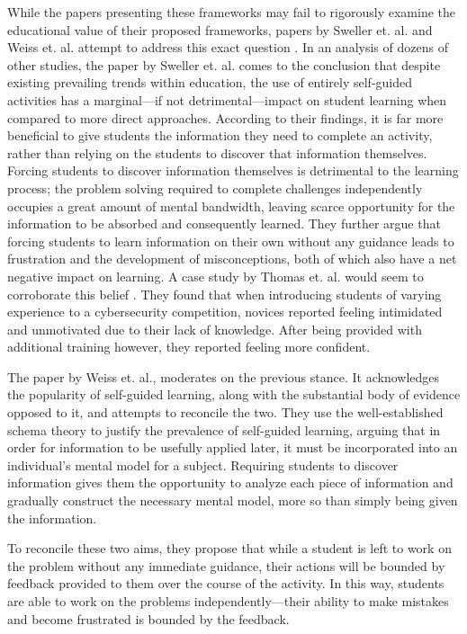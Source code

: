 \documentclass{article}
\begin{document}
    While the papers presenting these frameworks may fail to rigorously examine the educational value of their proposed frameworks, papers by Sweller et. al. and Weiss et. al. attempt to address this exact question \cite{J-Sweller,R-Weiss}. In an analysis of dozens of other studies, the paper by Sweller et. al. comes to the conclusion that despite existing prevailing trends within education, the use of entirely self-guided activities has a marginal---if not detrimental---impact on student learning when compared to more direct approaches. According to their findings, it is far more beneficial to give students the information they need to complete an activity, rather than relying on the students to discover that information themselves. 
    Forcing students to discover information themselves is detrimental to the learning process; the problem solving required to complete challenges independently occupies a great amount of mental bandwidth, leaving scarce opportunity for the information to be absorbed and consequently learned. 
    They further argue that forcing students to learn information on their own without any guidance leads to frustration and the development of misconceptions, both of which also have a net negative impact on learning. 
    A case study by Thomas et. al. would seem to corroborate this belief \cite{L-Thomas}. They found that when introducing students of varying experience to a cybersecurity competition, novices reported feeling intimidated and unmotivated due to their lack of knowledge. After being provided with additional training however, they reported feeling more confident. 

    The paper by Weiss et. al., moderates on the previous stance. It acknowledges the popularity of self-guided learning, along with the substantial body of evidence opposed to it, and attempts to reconcile the two. They use the well-established schema theory to justify the prevalence of self-guided learning, arguing that in order for information to be usefully applied later, it must be incorporated into an individual’s mental model for a subject. 
    Requiring students to discover information gives them the opportunity to analyze each piece of information and gradually construct the necessary mental model, more so than simply being given the information. 

    To reconcile these two aims, they propose that while a student is left to work on the problem without any immediate guidance, their actions will be bounded by feedback provided to them over the course of the activity. 
    In this way, students are able to work on the problems independently---their ability to make mistakes and become frustrated is bounded by the feedback. 
\end{document}
